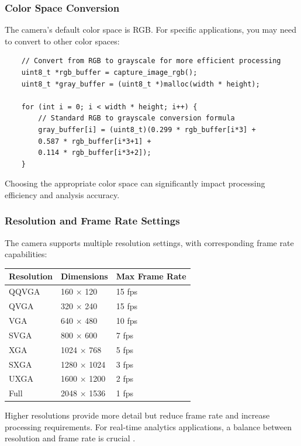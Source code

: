 \subsubsection{Color Space Conversion}
The camera's default color space is RGB. For specific applications, you may need to convert to other color spaces:

\begin{verbatim}
	// Convert from RGB to grayscale for more efficient processing
	uint8_t *rgb_buffer = capture_image_rgb();
	uint8_t *gray_buffer = (uint8_t *)malloc(width * height);
	
	for (int i = 0; i < width * height; i++) {
		// Standard RGB to grayscale conversion formula
		gray_buffer[i] = (uint8_t)(0.299 * rgb_buffer[i*3] + 
		0.587 * rgb_buffer[i*3+1] + 
		0.114 * rgb_buffer[i*3+2]);
	}
\end{verbatim}

Choosing the appropriate color space can significantly impact processing efficiency and analysis accuracy.

\subsubsection{Resolution and Frame Rate Settings}
The camera supports multiple resolution settings, with corresponding frame rate capabilities:

\begin{table}[h]
	\centering
	\begin{tabular}{|l|l|l|}
		\hline
		\textbf{Resolution} & \textbf{Dimensions} & \textbf{Max Frame Rate} \\
		\hline
		QQVGA & 160 × 120 & 15 fps \\
		QVGA & 320 × 240 & 15 fps \\
		VGA & 640 × 480 & 10 fps \\
		SVGA & 800 × 600 & 7 fps \\
		XGA & 1024 × 768 & 5 fps \\
		SXGA & 1280 × 1024 & 3 fps \\
		UXGA & 1600 × 1200 & 2 fps \\
		Full & 2048 × 1536 & 1 fps \\
		\hline
	\end{tabular}
\end{table}

Higher resolutions provide more detail but reduce frame rate and increase processing requirements. For real-time analytics applications, a balance between resolution and frame rate is crucial \cite{Arducam:2023}.

